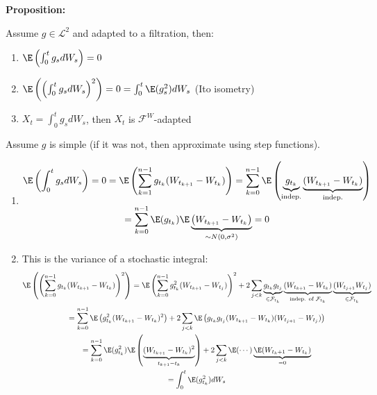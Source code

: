 \noindent\textbf{Proposition:}\par
\noindent Assume $g\in\mathcal{L}^2$ and adapted to a filtration, then:\par
\begin{enumerate}[leftmargin=*]
  \item $\E\left(\int_{0}^{t}g_sdW_s\right) = 0$
  \item $\E\left(\left(\int_{0}^{t}g_sdW_s\right)^2\right) = 0 = \int_{0}^{t}\E(g_s^2)dW_s$ (Ito isometry)
  \item $X_t = \int_{0}^{t}g_sdW_s$, then $X_t$ is $\mathcal{F}^W$-adapted
\end{enumerate}
\par\bigskip
\begin{prf}[]{}
  Assume $g$ is simple (if it was not, then approximate using step functions).
  \par\bigskip
  \begin{enumerate}[leftmargin=*]
    \item
      \begin{equation*}
        \begin{gathered}
          \E\left(\int_{0}^{t}g_sdW_s\right) = 0 = \E\left(\sum_{k=1}^{n-1}g_{t_k}(W_{t_{k+1}}-W_{t_k})\right) = \sum_{k=0}^{n-1}\E\left(\underbrace{g_{t_k}}_{\text{indep.}}\underbrace{(W_{t_{k+1}}-W_{t_k})}_{\text{indep.}}\right)\\
          = \sum_{k=0}^{n-1}\E(g_{t_k})\E\underbrace{\left(W_{t_{k+1}}-W_{t_k}\right)}_{\sim N(0,\sigma^2)} = 0
        \end{gathered}
      \end{equation*}
      \par\bigskip
    \item This is the variance of a stochastic integral:
      \begin{equation*}
        \begin{gathered}
          \E\left(\left(\sum_{k=0}^{n-1}g_{t_k}(W_{t_{k+1}}-W_{t_k})\right)^2\right) = \E\left(\sum_{k=0}^{n-1}g_{t_k}^2(W_{t_{k+1}}-W_{t_j})\right)^2 + 2\sum_{j<k}\underbrace{g_{t_k}g_{t_j}}_{\in\mathcal{F}_{t_k}}\underbrace{(W_{t_{k+1}}-W_{t_k})}_{\text{indep. of } \mathcal{F}_{t_k}}\underbrace{(W_{t_{j+1}}W_{t_j})}_{\in\mathcal{F}_{t_k}}\\
          = \sum_{k=0}^{n-1}\E\left(g_{t_k}^2(W_{t_{k+1}}-W_{t_k})^2\right)+2\sum_{j<k}\E\left(g_{t_k}g_{t_j}(W_{t_{k+1}}-W_{t_k})(W_{t_{j+1}}-W_{t_j})\right)\\
          = \sum_{k=0}^{n-1}\E(g_{t_k}^2)\E\left(\underbrace{(W_{t_{k+1}}-W_{t_k})^2}_{t_{k+1}-t_k}\right) + 2\sum_{j<k}\E(\cdots)\underbrace{\E(W_{t_k+1}-W_{t_k})}_{=0}\\
          = \int_{0}^{t}\E(g_{t_k}^2)dW_s
        \end{gathered}
      \end{equation*}
  \end{enumerate}
\end{prf}
\par\bigskip
